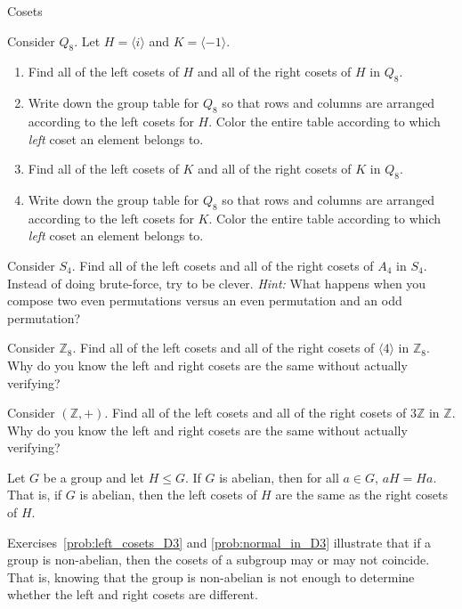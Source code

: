 \begin{section}{Cosets}
\begin{problem}\label{prob:normal_in_Q8}
Consider $Q_8$.  Let $H=\langle i\rangle$ and $K=\langle -1\rangle$.
\begin{enumerate}[label=\textrm{(\alph*)}]
\item Find all of the left cosets of $H$ and all of the right cosets of $H$ in $Q_8$.  
\item Write down the group table for $Q_8$ so that rows and columns are arranged according to the left cosets for $H$.  Color the entire table according to which \emph{left} coset an element belongs to.
\item Find all of the left cosets of $K$ and all of the right cosets of $K$ in $Q_8$.
\item Write down the group table for $Q_8$ so that rows and columns are arranged according to the left cosets for $K$.  Color the entire table according to which \emph{left} coset an element belongs to.
\end{enumerate}
\end{problem}

\begin{problem}
Consider $S_4$.  Find all of the left cosets and all of the right cosets of $A_4$ in $S_4$. Instead of doing brute-force, try to be clever. \emph{Hint:} What happens when you compose two even permutations versus an even permutation and an odd permutation?
\end{problem}

\begin{problem}
Consider $\mathbb{Z}_8$.  Find all of the left cosets and all of the right cosets of $\langle 4\rangle$ in $\mathbb{Z}_8$. Why do you know the left and right cosets are the same without actually verifying?
\end{problem}

\begin{problem}
Consider $(\mathbb{Z},+)$.  Find all of the left cosets and all of the right cosets of $3\mathbb{Z}$ in $\mathbb{Z}$. Why do you know the left and right cosets are the same without actually verifying?
\end{problem}

\begin{theorem}
Let $G$ be a group and let $H\leq G$. If $G$ is abelian, then for all $a\in G$, $aH=Ha$.  That is, if $G$ is abelian, then the left cosets of $H$ are the same as the right cosets of $H$.
\end{theorem}

Exercises~\ref{prob:left_cosets_D3} and \ref{prob:normal_in_D3} illustrate that if a group is non-abelian, then the cosets of a subgroup may or may not coincide.  That is, knowing that the group is non-abelian is not enough to determine whether the left and right cosets are different.


\end{section}
